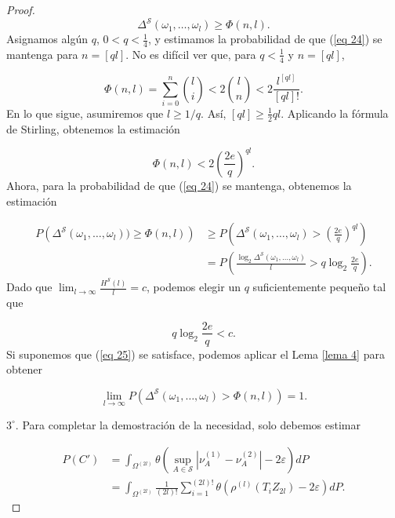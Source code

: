 \documentclass{report}
\begin{document}
\begin{proof}
\begin{equation}\label{eq 24}
\Delta^{\mathcal{S}}(\omega_1, \dots, \omega_l) \geq \Phi(n, l).
\end{equation}
Asignamos algún \( q \), \( 0 < q < \frac{1}{4} \), y estimamos la probabilidad de que (\ref{eq 24}) se mantenga para \( n = [ ql ] \). No es difícil ver que, para \( q < \frac{1}{4} \) y \( n = [ ql ] \),

\begin{equation*}
\Phi(n, l) = \sum_{i=0}^{n} \binom{l}{i} < 2 \binom{l}{n} < 2 \frac{l^{[ ql ]}}{[ ql ] !}.
\end{equation*}
En lo que sigue, asumiremos que \( l \geq 1/q \). Así, \( [ ql ] \geq \frac{1}{2} ql \). Aplicando la fórmula de Stirling, obtenemos la estimación

\begin{equation*}
\Phi(n, l) < 2 \left( \frac{2e}{q} \right)^{ql}.
\end{equation*}
Ahora, para la probabilidad de que (\ref{eq 24}) se mantenga, obtenemos la estimación

\begin{align*}
P \left( \Delta^{\mathcal{S}}(\omega_1, \dots, \omega_l))  \geq  \Phi(n, l) \right)
&\geq P \left( \Delta^{\mathcal{S}}(\omega_1, \dots, \omega_l) > \left( \frac{2e}{q} \right)^{ql} \right) \\
&= P \left( \frac{\log_2 \Delta^{\mathcal{S}}(\omega_1, \dots, \omega_l)}{l} > q \log_2 \frac{2e}{q} \right).
\end{align*}
Dado que \( \lim_{l \to \infty} \frac{H^{\mathcal{S}}(l)}{l} = c \), podemos elegir un \( q \) suficientemente pequeño tal que

\begin{equation}\label{eq 25}
q \log_2 \frac{2e}{q} < c.
\end{equation}
Si suponemos que (\ref{eq 25}) se satisface, podemos aplicar el Lema \ref{lema 4} para obtener

\begin{equation}\label{eq 26}
\lim_{l \to \infty} P \left( \Delta^{\mathcal{S}}(\omega_1, \dots, \omega_l) > \Phi(n, l) \right) = 1.
\end{equation}

\bigskip

\( 3^\circ \). Para completar la demostración de la necesidad, solo debemos estimar

\begin{equation*}
\begin{aligned}
P(C') &= \int_{\Omega^{(2l)}} \theta \left( \sup_{A \in \mathcal{S}} | \nu_A^{(1)} - \nu_A^{(2)} | - 2\varepsilon \right) dP \\
&= \int_{\Omega^{(2l)}} \frac{1}{(2l)!} \sum_{i=1}^{(2l)!} \theta \left( \rho^{(l)} (T_i Z_{2l}) - 2\varepsilon \right) dP.
\end{aligned}
\end{equation*}


\end{proof}
\end{document}
